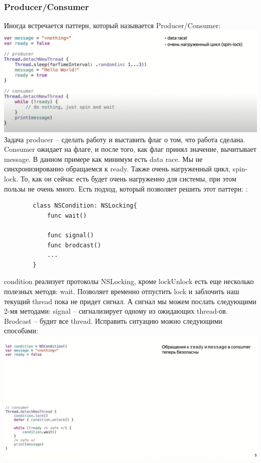 \documentclass{article}
\begin{document}
    \subsubsection{Producer/Consumer}
    Иногда встречается паттерн, который называется Producer/Consumer:
    \newline
    \includegraphics[scale = 0.5]{pic/Снимок экрана 2023-08-04 в 12.24.54.png}
    \newline
    Задача producer -- сделать работу и выставить флаг о том, что работа сделана. 
    \newline
    Consumer ожидает на флаге, и после того, как флаг принял значение, вычитывает message.
    \newline
    В данном примере как минимум есть data race. Мы не синхронизированно обращаемся к ready. Также очень нагруженный цикл, spin-lock. То, как он сейчас есть будет очень нагруженно для системы, при этом пользы не очень много. 
    \newline
    Есть подход, который позволяет решить этот паттерн: :
    \begin{verbatim}
        class NSCondition: NSLocking{
            func wait()

            func signal()
            func brodcast()
            ...
        }
    \end{verbatim}
    condition реализует протоколы NSLocking, кроме lockUnlock есть еще несколько полезных методв: wait. Позволяет временно отпустить lock и заблочить наш текущий thread пока не придет сигнал. А сигнал мы можем послать следующими 2-мя методами: signal -- сигнализирует одному из ожидающих thread-ов. Brodcast -- будит все thread.
    \newline
    Исправить ситуацию можно следующими способами: 
    \newline
    \includegraphics[scale = 0.5]{pic/Снимок экрана 2023-08-04 в 12.37.05.png}
\end{document}
